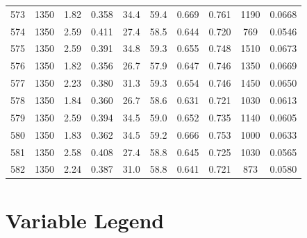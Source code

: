 \documentclass[11pt,twocolumn]{article}
\begin{document}
\begin{minipage}{\textwidth}
\begin{tabulary}{\linewidth}{C C C C C C C C C C}
573  &       1350 &            1.82 &    0.358 &      34.4	&	59.4 &       0.669 &      0.761 &            1190 &          0.0668 \\
574  &       1350 &            2.59 &    0.411 &      27.4	&	58.5 &       0.644 &      0.720 &              769 &          0.0546 \\
575  &       1350 &            2.59 &    0.391 &      34.8	&	59.3 &       0.655 &      0.748 &            1510 &          0.0673 \\
576  &       1350 &            1.82 &    0.356 &      26.7	&	57.9 &       0.647 &      0.746 &            1350 &          0.0669 \\
577  &       1350 &            2.23 &    0.380 &      31.3	&	59.3 &       0.654 &      0.746 &            1450 &          0.0650 \\
578  &       1350 &            1.84 &    0.360 &      26.7	&	58.6 &       0.631 &      0.721 &            1030 &          0.0613 \\
579  &       1350 &            2.59 &    0.394 &      34.5	&	59.0 &       0.652 &      0.735 &            1140 &          0.0605 \\
580  &       1350 &            1.83 &    0.362 &      34.5	&	59.2 &       0.666 &      0.753 &            1000 &          0.0633 \\
581  &       1350 &            2.58 &    0.408 &      27.4	&	58.8 &       0.645 &      0.725 &            1030 &          0.0565 \\
582  &       1350 &            2.24 &    0.387 &      31.0	&	58.8 &       0.641 &      0.721 &              873 &          0.0580 \\

\bottomrule
\end{tabulary}
\end{minipage}



\section{Variable Legend}
\label{app_var}
\end{document}
